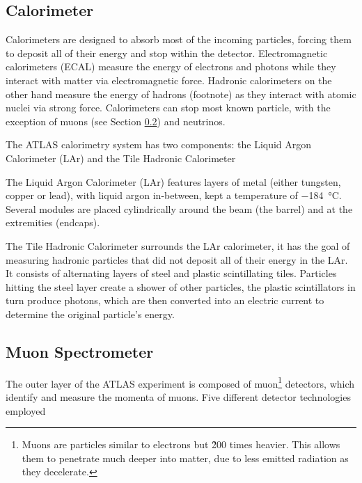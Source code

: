 \subsection{Calorimeter}\label{subsec:ATLAS_calorimeter}


Calorimeters are designed to absorb most of the incoming particles, forcing them to deposit all of their energy and stop within the detector. Electromagnetic calorimeters (ECAL) measure the energy of electrons and photons while they interact with matter via electromagnetic force. Hadronic calorimeters on the other hand measure the energy of hadrons (footnote) as they interact with atomic nuclei via strong force. Calorimeters can stop most known particle, with the exception of muons (see Section \ref{subsec:muon_spectrometer}) and neutrinos.

The ATLAS calorimetry system has two components: the Liquid Argon Calorimeter (LAr) and the Tile Hadronic Calorimeter

The Liquid Argon Calorimeter (LAr) features layers of metal (either tungsten, copper or lead), with liquid argon in-between, kept a temperature of \qty{-184}{\degreeCelsius}. Several modules are placed cylindrically around the beam (the barrel) and at the extremities (endcaps).

The Tile Hadronic Calorimeter surrounds the LAr calorimeter, it has the goal of measuring hadronic particles that did not deposit all of their energy in the LAr. It consists of alternating layers of steel and plastic scintillating tiles. Particles hitting the steel layer create a shower of other particles, the plastic scintillators in turn produce photons, which are then converted into an electric current to determine the original particle's energy.


\subsection{Muon Spectrometer}\label{subsec:muon_spectrometer}

The outer layer of the ATLAS experiment is composed of muon\footnote{Muons are particles similar to electrons but \~200 times heavier. This allows them to penetrate much deeper into matter, due to less emitted radiation as they decelerate.} detectors, which identify and measure the momenta of muons. Five different detector technologies employed 

